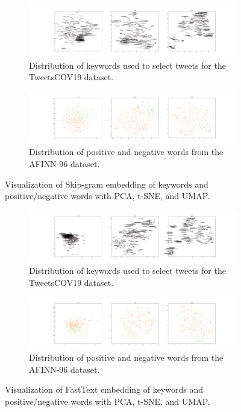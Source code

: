 \begin{figure}
 \centering
 \begin{subfigure}{\columnwidth}
 \includegraphics[width=1\textwidth]{images/keywords_sgram.pdf}
 \caption{Distribution of keywords used to select tweets for the TweetsCOV19 dataset.}
 \label{fig:sgram_key}
 \end{subfigure}
 \centering
 \begin{subfigure}{\columnwidth}
 \includegraphics[width=1\textwidth]{images/keywords_sgram_posneg.pdf}
 \caption{Distribution of positive and negative words from the AFINN-96 dataset.}
  \label{fig:sgram_posneg}
 \end{subfigure}
 \caption{Visualization of Skip-gram embedding of keywords and positive/negative words with PCA, t-SNE, and UMAP.}
 \label{fig:sgram_viz}
\end{figure}

\begin{figure}
 \centering
 \begin{subfigure}{\columnwidth}
 \includegraphics[width=1\textwidth]{images/keywords_ft.pdf}
 \caption{Distribution of keywords used to select tweets for the TweetsCOV19 dataset.}
 \label{fig:ft_key}
 \end{subfigure}
 \centering
 \begin{subfigure}{\columnwidth}
 \includegraphics[width=1\textwidth]{images/keywords_ft_posneg.pdf}
 \caption{Distribution of positive and negative words from the AFINN-96 dataset.}
  \label{fig:ft_posneg}
 \end{subfigure}
 \caption{Visualization of FastText embedding of keywords and positive/negative words with PCA, t-SNE, and UMAP.}
 \label{fig:ft_viz}
\end{figure}

